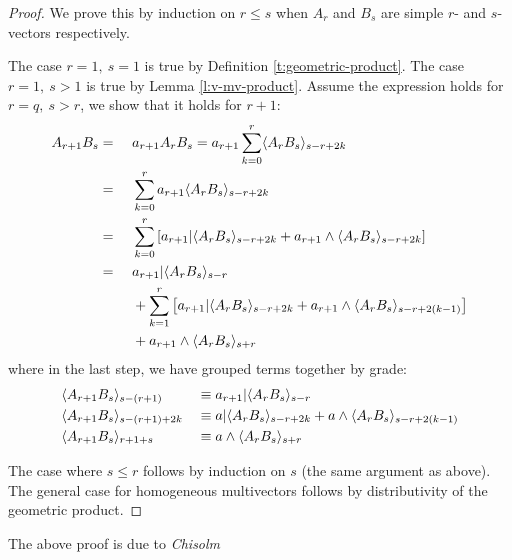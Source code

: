 \begin{proof}
	We prove this by induction on $r \leq s$ when $A_r$ and $B_s$ are simple $r$- and $s$-vectors respectively.

	The case $r=1,\ s=1$ is true by Definition \ref{t:geometric-product}.
	The case $r=1,\ s>1$ is true by Lemma \ref{l:v-mv-product}.
	Assume the expression holds for $r = q,\ s > r$, we show that it holds for $r+1$:
	\begin{alignat*}{2}
		A_{r+1}B_s &=\ &&a_{r+1}A_rB_s = a_{r+1}\sum_{k=0}^r \langle A_rB_s \rangle_{s-r+2k} \\
				   &= &&\sum_{k=0}^r a_{r+1}\langle A_rB_s \rangle_{s-r+2k} \\
				   &= &&\sum_{k=0}^r \left[a_{r+1} | \langle A_rB_s \rangle_{s-r+2k} + a_{r+1} \wedge \langle A_rB_s \rangle_{s-r+2k}\right]\\
				   &=\ &&a_{r+1} | \langle A_rB_s \rangle_{s-r} \\
				   &  &&+ \sum_{k=1}^r \left[a_{r+1} | \langle A_rB_s \rangle_{s-r+2k} + a_{r+1} \wedge \langle A_rB_s \rangle_{s-r+2(k-1)}\right]\\
				   &  &&+ a_{r+1}\wedge \langle A_rB_s \rangle_{s+r}
	\end{alignat*}
	where in the last step, we have grouped terms together by grade:
	\begin{alignat*}{2}
		&\langle A_{r+1}B_s \rangle_{s-(r+1)} &&\equiv a_{r+1} | \langle A_rB_s \rangle_{s-r} \\
		&\langle A_{r+1}B_s \rangle_{s-(r+1)+2k} &&\equiv a | \langle A_rB_s \rangle_{s-r+2k} + a \wedge \langle A_rB_s \rangle_{s-r+2(k-1)} \\
		&\langle A_{r+1}B_s \rangle_{r+1+s} &&\equiv a \wedge \langle A_rB_s \rangle_{s+r}
	\end{alignat*}

	The case where $s \leq r$ follows by induction on $s$ (the same argument as above).
	The general case for homogeneous multivectors follows by distributivity of the geometric product.
\end{proof}

The above proof is due to \textit{Chisolm} \cite[p. 20-21]{ga-chisolm}
